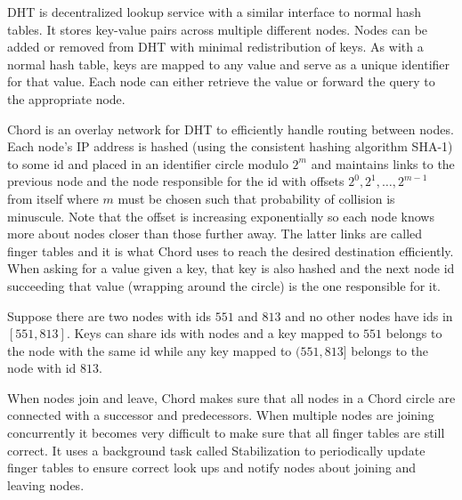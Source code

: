 DHT is decentralized lookup service with a similar interface to normal hash tables. It stores key-value pairs across multiple different nodes. Nodes can be added or removed from DHT with minimal redistribution of keys. As with a normal hash table, keys are mapped to any value and serve as a unique identifier for that value. Each node can either retrieve the value or forward the query to the appropriate node.\cite{DHT-History}

Chord is an overlay network for DHT to efficiently handle routing between nodes. Each node's IP address is hashed (using the consistent hashing algorithm SHA-1) to some id and placed in an identifier circle modulo $2^m$ and maintains links to the previous node and the node responsible for the id with offsets $2^0, 2^1, \ldots, 2^{m-1}$ from itself where $m$ must be chosen such that probability of collision is minuscule. Note that the offset is increasing exponentially so each node knows more about nodes closer than those further away. The latter links are called finger tables and it is what Chord uses to reach the desired destination efficiently. When asking for a value given a key, that key is also hashed and the next node id succeeding that value (wrapping around the circle) is the one responsible for it.\cite{chord-peer-to-peer}

Suppose there are two nodes with ids $551$ and $813$ and no other nodes have ids in $[551,813]$. Keys can share ids with nodes and a key mapped to $551$ belongs to the node with the same id while any key mapped to $(551,813]$ belongs to the node with id $813$.

When nodes join and leave, Chord makes sure that all nodes in a Chord circle are connected with a successor and predecessors. When multiple nodes are joining concurrently it becomes very difficult to make sure that all finger tables are still correct. It uses a background task called Stabilization to periodically update finger tables to ensure correct look ups and notify nodes about joining and leaving nodes.\cite{chord-peer-to-peer}